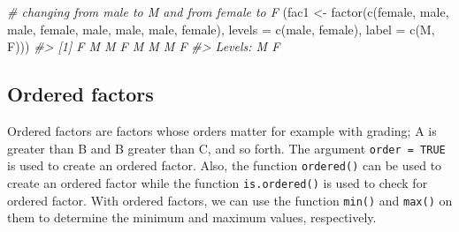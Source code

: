 \documentclass[
]{book}
\newenvironment{Shaded}{\begin{snugshade}}{\end{snugshade}}
\newcommand{\AttributeTok}[1]{\textcolor[rgb]{0.77,0.63,0.00}{#1}}
\newcommand{\CommentTok}[1]{\textcolor[rgb]{0.56,0.35,0.01}{\textit{#1}}}
\newcommand{\FunctionTok}[1]{\textcolor[rgb]{0.00,0.00,0.00}{#1}}
\newcommand{\NormalTok}[1]{#1}
\newcommand{\OtherTok}[1]{\textcolor[rgb]{0.56,0.35,0.01}{#1}}
\newcommand{\StringTok}[1]{\textcolor[rgb]{0.31,0.60,0.02}{#1}}
\begin{document}
\begin{Shaded}
\begin{Highlighting}[]
\CommentTok{\# changing from male to M and from female to F}
\NormalTok{(fac1 }\OtherTok{\textless{}{-}} \FunctionTok{factor}\NormalTok{(}\FunctionTok{c}\NormalTok{(}\StringTok{\textquotesingle{}female\textquotesingle{}}\NormalTok{, }\StringTok{\textquotesingle{}male\textquotesingle{}}\NormalTok{, }\StringTok{\textquotesingle{}male\textquotesingle{}}\NormalTok{, }\StringTok{\textquotesingle{}female\textquotesingle{}}\NormalTok{, }\StringTok{\textquotesingle{}male\textquotesingle{}}\NormalTok{, }\StringTok{\textquotesingle{}male\textquotesingle{}}\NormalTok{, }\StringTok{\textquotesingle{}male\textquotesingle{}}\NormalTok{, }\StringTok{\textquotesingle{}female\textquotesingle{}}\NormalTok{), }
               \AttributeTok{levels =} \FunctionTok{c}\NormalTok{(}\StringTok{\textquotesingle{}male\textquotesingle{}}\NormalTok{, }\StringTok{\textquotesingle{}female\textquotesingle{}}\NormalTok{), }
               \AttributeTok{label =} \FunctionTok{c}\NormalTok{(}\StringTok{\textquotesingle{}M\textquotesingle{}}\NormalTok{, }\StringTok{\textquotesingle{}F\textquotesingle{}}\NormalTok{)))}
\CommentTok{\#\textgreater{} [1] F M M F M M M F}
\CommentTok{\#\textgreater{} Levels: M F}
\end{Highlighting}
\end{Shaded}

\hypertarget{ordered-factors}{%
\subsection{Ordered factors}\label{ordered-factors}}

Ordered factors are factors whose orders matter for example with grading; A is greater than B and B greater than C, and so forth. The argument \texttt{order\ =\ TRUE} is used to create an ordered factor. Also, the function \texttt{ordered()} can be used to create an ordered factor while the function \texttt{is.ordered()} is used to check for ordered factor. With ordered factors, we can use the function \texttt{min()} and \texttt{max()} on them to determine the minimum and maximum values, respectively.
\end{document}
